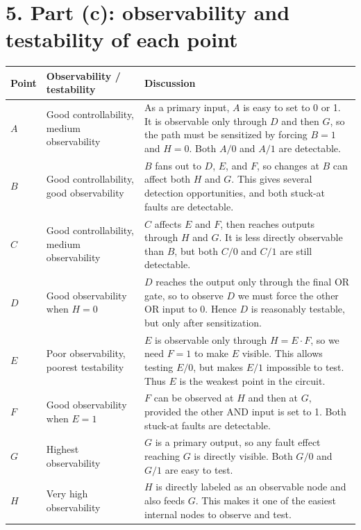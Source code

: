 \documentclass[11pt,a4paper]{article}
\begin{document}
\section*{5. Part (c): observability and testability of each point}
\begin{center}
\begin{tabular}{>{\raggedright\arraybackslash}p{1cm} >{\raggedright\arraybackslash}p{3cm} >{\raggedright\arraybackslash}p{7.2cm}}
\toprule
Point & Observability / testability & Discussion \\
\midrule
$A$ & Good controllability, medium observability & As a primary input, $A$ is easy to set to 0 or 1. It is observable only through $D$ and then $G$, so the path must be sensitized by forcing $B=1$ and $H=0$. Both $A/0$ and $A/1$ are detectable. \\
$B$ & Good controllability, good observability & $B$ fans out to $D$, $E$, and $F$, so changes at $B$ can affect both $H$ and $G$. This gives several detection opportunities, and both stuck-at faults are detectable. \\
$C$ & Good controllability, medium observability & $C$ affects $E$ and $F$, then reaches outputs through $H$ and $G$. It is less directly observable than $B$, but both $C/0$ and $C/1$ are still detectable. \\
$D$ & Good observability when $H=0$ & $D$ reaches the output only through the final OR gate, so to observe $D$ we must force the other OR input to 0. Hence $D$ is reasonably testable, but only after sensitization. \\
$E$ & Poor observability, poorest testability & $E$ is observable only through $H=E\cdot F$, so we need $F=1$ to make $E$ visible. This allows testing $E/0$, but makes $E/1$ impossible to test. Thus $E$ is the weakest point in the circuit. \\
$F$ & Good observability when $E=1$ & $F$ can be observed at $H$ and then at $G$, provided the other AND input is set to 1. Both stuck-at faults are detectable. \\
$G$ & Highest observability & $G$ is a primary output, so any fault effect reaching $G$ is directly visible. Both $G/0$ and $G/1$ are easy to test. \\
$H$ & Very high observability & $H$ is directly labeled as an observable node and also feeds $G$. This makes it one of the easiest internal nodes to observe and test. \\
\bottomrule
\end{tabular}
\end{center}
\end{document}
